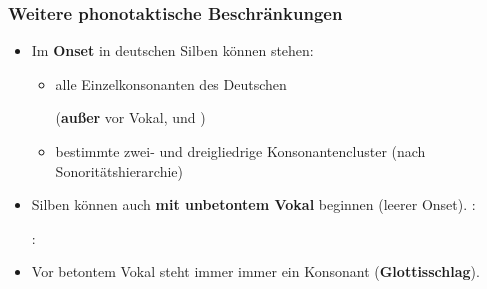 \begin{frame}
\frametitle{Weitere phonotaktische Beschränkungen}

\begin{itemize}
	\item Im \textbf{Onset} in deutschen Silben können stehen:
	
	\begin{itemize}
		\item alle Einzelkonsonanten des Deutschen 
		
		(\textbf{außer} \textipa{[s]} vor Vokal, und \textipa{[N]})

		\item bestimmte zwei- und dreigliedrige Konsonantencluster (nach Sonoritätshierarchie)
	\end{itemize}
	
\pause 
	
	\item Silben können auch \textbf{mit unbetontem Vokal} beginnen (\ras leerer Onset).
	\ea {}: 
	\z
	
	\ea {}:  
	\z

\pause 
	
	\item Vor betontem Vokal steht immer immer ein Konsonant (\textbf{Glottisschlag}).
	
	\ea
	\z

\end{itemize}

\end{frame}




